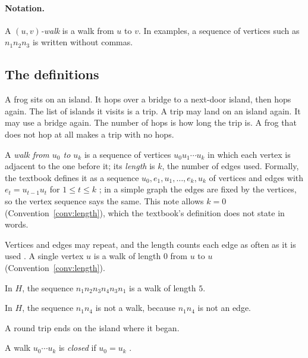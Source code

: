 \paragraph{Notation.} A \emph{$(u,v)$-walk} is a walk from $u$ to $v$.
In examples, a sequence of vertices such as $n_1n_2n_3$ is written
without commas.

\subsection{The definitions}

\plainwords{} A frog sits on an island. It hops over a bridge to a
next-door island, then hops again. The list of islands it visits is a
trip. A trip may land on an island again. It may use a bridge again. The
number of hops is how long the trip is. A frog that does not hop at all
makes a trip with no hops.

\begin{definition}\label{def:walk}
A \emph{walk from $u_0$ to $u_k$} is a sequence of vertices
$u_0u_1\cdots u_k$ in which each vertex is adjacent to the one before it;
its \emph{length} is $k$, the number of edges used. Formally, the textbook
defines it as a sequence $u_0,e_1,u_1,\dots,e_k,u_k$ of vertices and edges
with $e_t=u_{t-1}u_t$ for $1\le t\le k$
\cite[Definition~1.2.10, p.~21]{petrosyan2015graphs}; in a simple graph the
edges are fixed by the vertices, so the vertex sequence says the same. This
note allows $k=0$ (Convention~\ref{conv:length}), which the textbook's
definition does not state in words.
\end{definition}

\begin{remark}
Vertices and edges may repeat, and the length counts each edge as often as
it is used \cite[p.~22]{petrosyan2015graphs}. A single vertex $u$ is a walk
of length 0 from $u$ to $u$ (Convention~\ref{conv:length}).
\end{remark}
\begin{example}
In $H$, the sequence $n_1n_2n_3n_4n_3n_1$ is a walk of length $5$.
\end{example}
\begin{nonexample}
In $H$, the sequence $n_1n_4$ is not a walk, because $n_1n_4$ is not an
edge.
\end{nonexample}

\plainwords{} A round trip ends on the island where it began.

\begin{definition}\label{def:closed}
A walk $u_0\cdots u_k$ is \emph{closed} if $u_0=u_k$
\cite[Definition~1.2.11, p.~22]{petrosyan2015graphs}.
\end{definition}

